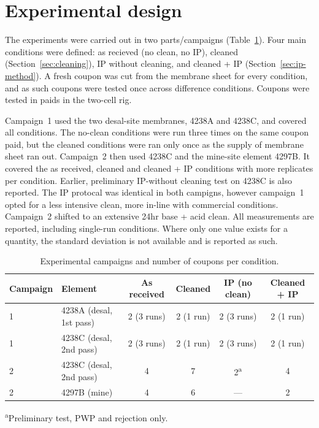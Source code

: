 \section{Experimental design}
\label{sec:experimental-design}
The experiments were carried out in two parts/campaigns (Table~\ref{tab:campaigns}). Four main conditions were defined: as recieved (no clean, no IP), cleaned (Section~\ref{sec:cleaning}), IP without cleaning, and cleaned + IP (Section~\ref{sec:ip-method}). A fresh coupon was cut from the membrane sheet for every condition, and as such coupons were tested once across difference conditions. Coupons were tested in paids in the two-cell rig.

Campaign~1 used the two desal-site membranes, 4238A and 4238C, and covered all conditions. The no-clean conditions were run three times on the same coupon paid, but the cleaned conditions were ran only once as the supply of membrane sheet ran out. Campaign~2 then used 4238C and the mine-site element 4297B. It covered the as received, cleaned and cleaned + IP conditions with more replicates per condition. Earlier, preliminary IP-without cleaning test on 4238C is also reported. The IP protocal was identical in both campigns, however campaign~1 opted for a less intensive clean, more in-line with commercial conditions. Campaign~2 shifted to an extensive 24hr base + acid clean. All measurements are reported, including single-run conditions. Where only one value exists for a quantity, the standard deviation is not available and is reported as such. 

\begin{table}[htbp]
  \centering
  \caption{Experimental campaigns and number of coupons per condition.}
  \label{tab:campaigns}
  \begin{tabular}{llcccc}
    \toprule
    Campaign & Element & As received & Cleaned & IP (no clean) & Cleaned + IP \\
    \midrule
    1 & 4238A (desal, 1st pass) & 2 (3 runs) & 2 (1 run) & 2 (3 runs) & 2 (1 run) \\
    1 & 4238C (desal, 2nd pass) & 2 (3 runs) & 2 (1 run) & 2 (3 runs) & 2 (1 run) \\
    2 & 4238C (desal, 2nd pass) & 4 & 7 & 2\textsuperscript{a} & 4 \\
    2 & 4297B (mine)            & 4 & 6 & --- & 2 \\
    \bottomrule
  \end{tabular}
  \par\smallskip
  \footnotesize \textsuperscript{a}Preliminary test, PWP and rejection only.
\end{table}

